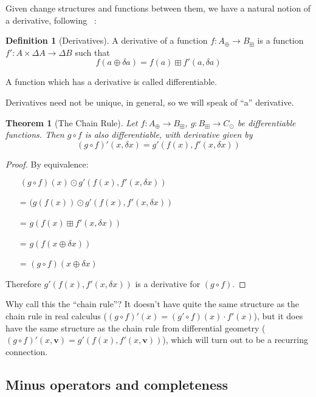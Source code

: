 \documentclass[english]{article}
\theoremstyle{plain}
\newtheorem{thm}{Theorem}
\theoremstyle{definition}
\theoremstyle{remark}
\theoremstyle{remark}
\theoremstyle{remark}
\theoremstyle{definition}
\newtheorem{defn}{Definition}
\newcommand{\cplus}{\oplus}
\newcommand{\cpluss}{\boxplus}
\newcommand{\cplusss}{\odot}
\newcommand{\changes}[1]{\Delta #1}
\newcommand{\change}[1]{\delta #1}
\newcommand{\derive}[1]{#1'}
\begin{document}
Given change structures and functions between them, we have a natural notion of a derivative, following ~\cite{cai2014changes}:

\begin{defn}[Derivatives]
  A derivative of a function $f: A_\cplus \rightarrow B_\cpluss$ is a function $\derive{f}: A \times \changes{A} \rightarrow
  \changes{B}$ such that
  $$f(a \cplus \change{a}) = f(a) \cpluss \derive{f}(a, \change{a})$$

  A function which has a derivative is called differentiable.
\end{defn}

Derivatives need not be unique, in general, so we will speak of ``a'' derivative.

\begin{thm}[The Chain Rule]
  Let $f: A_\cplus \rightarrow B_\cpluss$, $g: B_\cpluss \rightarrow C_\cplusss$ be differentiable functions. Then $g \circ f$ is also
  differentiable, with derivative given by
   $$\derive{(g \circ f)}(x, \change{x}) = \derive{g}\left(f(x), \derive{f}(x, \change{x})\right)$$
\end{thm}
\begin{proof}
  By equivalence:
  \begin{itemize}
    \item[ ]$(g \circ f)(x) \cplusss \derive{g}\left(f(x), \derive{f}(x,\change{x})\right)$
    \item[=]$(g(f(x)) \cplusss \derive{g}\left(f(x), \derive{f}(x,\change{x})\right)$
    \item[=]$g\left(f(x) \cpluss \derive{f}(x, \change{x}) \right)$
    \item[=]$g\left(f(x \cplus \change{x})\right)$
    \item[=]$(g \circ f)(x \cplus \change{x})$
  \end{itemize}
  Therefore $\derive{g}\left(f(x), \derive{f}(x, \change{x})\right)$ is a
  derivative for $(g \circ f)$.
\end{proof}

Why call this the ``chain rule''? It doesn't have quite the same structure as
the chain rule in real calculus ($\derive{(g \circ f)}(x) = (\derive{g} \circ f)
(x) \cdot \derive{f}(x)$), but it does have the same structure as the chain rule
from differential geometry ($\derive{(g \circ f)}(x, \textbf{v}) = \derive{g}
(f(x), \derive{f}(x, \textbf{v}))$), which will turn out to be a recurring connection.

\subsection{Minus operators and completeness}
\end{document}
